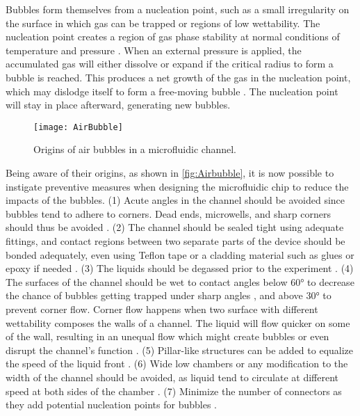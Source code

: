 Bubbles form themselves from a nucleation point, such as a small irregularity on the surface in which gas can be trapped or regions of low wettability. The nucleation point creates a region of gas phase stability at normal conditions of temperature and pressure \cite{Ufluidix}. When an external pressure is applied, the accumulated gas will either dissolve or expand if the critical radius to form a bubble is reached.  This produces a net growth of the gas in the nucleation point, which may dislodge itself to form a free-moving bubble \cite{Ufluidix,bruus2011theoretical}. The nucleation point will stay in place afterward, generating new bubbles. \par
\begin{figure}[h]
    \centering
    \texttt{[image: AirBubble]}
    \caption{Origins of air bubbles in a microfluidic channel. \citep{Ufluidix}}
    \label{fig:Airbubble}
\end{figure}
Being aware of their origins, as shown in \autoref{fig:Airbubble}, it is now possible to instigate preventive measures when designing the microfluidic chip to reduce the impacts of the bubbles. (1) Acute angles in the channel should be avoided since bubbles tend to adhere to corners. Dead ends, microwells, and sharp corners should thus be avoided \cite{AirBubbles,Ufluidix}. (2) The channel should be sealed tight using adequate fittings, and contact regions between two separate parts of the device should be bonded adequately, even using Teflon tape or a cladding material such as glues or epoxy if needed \cite{AirBubbles,Ufluidix}. (3) The liquids should be degassed prior to the experiment \cite{AirBubbles}. (4) The surfaces of the channel should be wet to contact angles below 60° to decrease the chance of bubbles getting trapped under sharp angles \cite{Olanrewaju2018,Ufluidix}, and above 30° to prevent corner flow. Corner flow happens when two surface with different wettability composes the walls of a channel. The liquid will flow quicker on some of the wall, resulting in an unequal flow which might create bubbles or even disrupt the channel’s function \cite{Olanrewaju2018}. (5) Pillar-like structures can be added to equalize the speed of the liquid front \cite{Ufluidix}. (6) Wide low chambers or any modification to the width of the channel should be avoided, as liquid tend to circulate at different speed at both sides of the chamber \cite{Ufluidix}. (7) Minimize the number of connectors as they add potential nucleation points for bubbles \cite{Ufluidix}.\par

